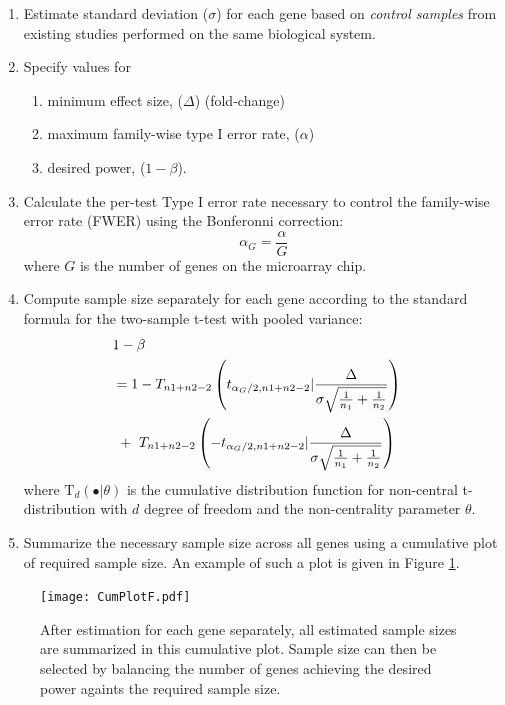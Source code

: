\documentclass{bioinfo}
\begin{document}
\begin{enumerate}
\item{Estimate standard deviation ($\sigma$) for each gene based on
    \emph{control samples} from existing studies performed on the
    same biological system.}

\item{Specify values for
    \begin{enumerate}
    \item minimum effect size, ($\Delta$) (fold-change)
    \item maximum family-wise type I error rate, ($\alpha$)
    \item desired power, ($1 - \beta$).
    \end{enumerate}
  }

\item{Calculate the per-test Type I error rate necessary to control
    the family-wise error rate (FWER) using the Bonferonni correction:}
\begin{equation}
  \alpha_G = \frac{\alpha}{G}
\end{equation}
%
where $G$ is the number of genes on the microarray chip.

\item{Compute sample size separately for each gene according to the
    standard formula for the two-sample t-test with pooled variance:}
  \begin{eqnarray}
    \lefteqn{1-\beta} \nonumber \\
    &= 1-T_{n1+n2-2} \left( t_{\alpha_G/2,n1+n2-2} | \frac{\Delta}{\sigma \sqrt{\frac{1}{n_1} + \frac{1}{n_2}}}\right) \nonumber \\
    &  ~+~T_{n1+n2-2} \left( -t_{\alpha_G/2,n1+n2-2} | \frac{\Delta}{\sigma \sqrt{\frac{1}{n_1} + \frac{1}{n_2}}}\right)
    \label{eq:formula}
  \end{eqnarray}
  where $\mathrm{T}_{d}(\bullet|\theta)$ is the cumulative
  distribution function for non-central t-distribution with $d$ degree
  of freedom and the non-centrality parameter $\theta$.

\item{Summarize the necessary sample size across all genes using a
    cumulative plot of required sample size. An example of such a plot
    is given in Figure \ref{fig:CumPlot}.}

\end{enumerate}

\begin{figure}[h]
  \centerline{\texttt{[image: CumPlotF.pdf]}}
  \caption[Cumulative Plot of Sample Size Calculated for All Genes]
  {After estimation for each gene separately, all estimated sample
    sizes are summarized in this cumulative plot. Sample size can then
    be selected by balancing the number of genes achieving the desired
    power againts the required sample size.}
  \label{fig:CumPlot}
\end{figure}
\end{document}
